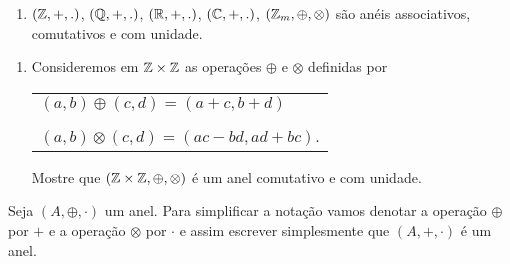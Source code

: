 \documentclass{beamer}
\begin{document}
    \begin{frame}
        \begin{exemplos}
            \begin{enumerate}[label={\arabic*})]
                \item $(\mathbb{Z},+,.)$, $(\mathbb{Q},+,.)$, $(\mathbb{R},+,.)$, $(\mathbb{C},+,.)$, $(\mathbb{Z}_m, \oplus, \otimes)$ s{\~a}o an{\'e}is associativos, comutativos e com unidade.

                \seti
            \end{enumerate}
        \end{exemplos}
    \end{frame}

    \begin{frame}
        \begin{exemplos}
            \begin{enumerate}[label={\arabic*})]
                \conti

                \item  Consideremos em $\mathbb{Z} \times \mathbb{Z}$ as opera\c{c}\~oes $\oplus$ e $\otimes$ definidas por
                \vspace{.3cm}
                \begin{center}
                    \begin{tabular}{l}
                        $(a, b) \oplus (c, d) = (a + c, b + d)$\\
                        \\
                        $(a ,b) \otimes (c, d) = (ac - bd, ad + bc)$.    
                    \end{tabular}
                \end{center}
                \vspace{.3cm}
                Mostre que $(\mathbb{Z} \times \mathbb{Z}, \oplus, \otimes)$ \'e um anel comutativo e com unidade.
            \end{enumerate}
        \end{exemplos}
    \end{frame}

    \begin{frame}
        \begin{observacao}
            Seja $(A, \oplus, \cdot)$ um anel. Para simplificar a nota\c{c}\~ao vamos denotar a opera\c{c}\~ao $\oplus$
            por $+$ e a opera\c{c}\~ao $\otimes$ por $\cdot$ e assim escrever simplesmente que $(A, +, \cdot)$ \'e um anel.
        \end{observacao}
    \end{frame}
\end{document}
